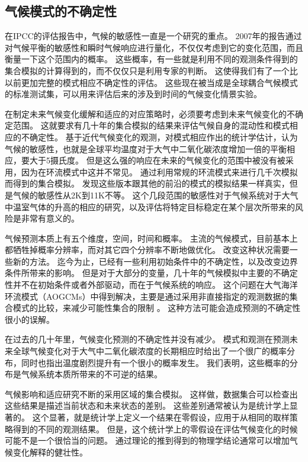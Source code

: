 \subsection{气候模式的不确定性}

在IPCC的评估报告中，气候的敏感性一直是一个研究的重点\cite{meehl2007global}。
2007年的报告通过对气候平衡的敏感性和瞬时气候响应进行量化，不仅仅考虑到它的变化范围，而且衡量一下这个范围内的概率。
这些概率，有一些就是利用不同的观测条件得到的集合模拟的计算得到的，而不仅仅只是利用专家的判断。 
这使得我们有了一个比以前更加完整的模式相应不确定性的评估。 
这些现在被当成是全球耦合气候模式的标准测试集，可以用来评估后来的涉及到时间的气候变化情景实验。

  
在制定未来气候变化缓解和适应的对应策略时，必须要考虑到未来气候变化的不确定范围。
这就要求有几十年的集合模拟的结果来评估气候自身的混动性和模式相应的不确定性。 
基于近代气候变化的观测，对模式相应作出的统计学估计，认为气候的敏感性，也就是全球平均温度对于大气中二氧化碳浓度增加一倍的平衡相应，要大于5摄氏度\cite{stainforth2005uncertainty}。
但是这么强的响应在未来的气候变化的范围中被没有被采用，因为在环流模式中这并不常见。 
通过利用常规的环流模式来进行几千次模拟而得到的集合模拟。 发现这些版本跟其他的前沿的模式的模拟结果一样真实，但是气候的敏感性从2K到11K不等。
这个几段范围的敏感性对于气候系统对于大气中温室气体的升高的相应的研究，以及评估将特定目标稳定在某个层次所带来的风险是非常有意义的。


 
气候预测本质上有五个维度，空间，时间和概率。 
主流的气候模式，目前基本上都牺牲掉概率分辨率，而对其它四个分辨率不断地做优化。
改变这种状况需要一些新的方法。
迄今为止，已经有一些利用初始条件中的不确定性，以及改变边界条件所带来的影响。
但是对于大部分的变量，几十年的气候模拟中主要的不确定性并不在初始条件或者外部驱动，而在于气候系统的响应。
这个问题在大气海洋环流模式（AOGCMs）中得到解决，主要是通过采用非直接指定的观测数据的集合模式的比较，来减少可能性集合的限制\cite{allen2002towards} 。 
这种方法可能会造成预测的不确定性很小的误解。

 
在过去的几十年里，气候变化预测的不确定性并没有减少\cite{roe2007climate}。 
模式和观测在预测未来全球气候变化对于大气中二氧化碳浓度的长期相应时给出了一个很广的概率分布，同时也指出温度剧烈提升有一个很小的概率发生。
我们表明，这些概率的分布是气候系统本质所带来的不可逆的结果。 


 
气候影响和适应研究不断的采用区域的集合模拟\cite{von2013testing}。
这样做，数据集合可以检查出这些结果是描述当前状态和未来状态的差别。
这些差别通常被认为是统计学上显著的。
这个显著，就是统计学上定义一个结果在零假设，应用于从相同的取样策略得到的不同的观测结果。 
但是，这个统计学上的零假设在评估气候变化的时候可能不是一个很恰当的问题。 
通过理论的推到得到的物理学结论通常可以增加气候变化解释的健壮性。



